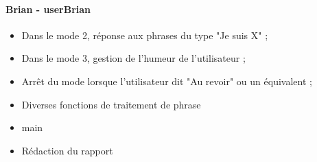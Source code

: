 \documentclass[paper=a4, fontsize=11pt]{article}
\begin{document}
\paragraph{Brian - userBrian} 
\begin{itemize}
\item Dans le mode 2, réponse aux phrases du type "Je suis X" ;
\item Dans le mode 3, gestion de l'humeur de l'utilisateur ;
\item Arrêt du mode lorsque l'utilisateur dit "Au revoir" ou un équivalent ;
\item Diverses fonctions de traitement de phrase
\item main
\item Rédaction du rapport
\end{itemize}
\end{document}
